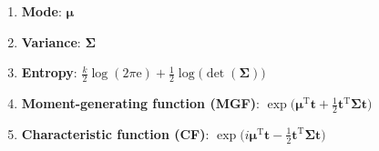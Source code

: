 \begin{enumerate}
    \item
    \textbf{Mode}:
    $ \bm{\mu} $
    \hfill\cite{wiki/Multivariate_normal_distribution}

    \item
    \textbf{Variance}:
    $ \bm{\Sigma} $
    \hfill\cite{wiki/Multivariate_normal_distribution}






    \item
    \textbf{Entropy}: $  {\displaystyle {\frac {k}{2}}\log {\mathord {\left(2\pi \mathrm {e} \right)}}+{\frac {1}{2}}\log (\det {\mathord {\left({\boldsymbol {\Sigma }}\right)}}}) $
    \hfill\cite{wiki/Multivariate_normal_distribution}

    \item
    \textbf{Moment-generating function (MGF)}: $  {\displaystyle \exp \!{\Big (}{\boldsymbol {\mu }}^{\mathrm {T} }\mathbf {t} +{\tfrac {1}{2}}\mathbf {t} ^{\mathrm {T} }{\boldsymbol {\Sigma }}\mathbf {t} {\Big )}} $
    \hfill\cite{wiki/Multivariate_normal_distribution}

    \item
    \textbf{Characteristic function (CF)}: $  {\displaystyle \exp \!{\Big (}i{\boldsymbol {\mu }}^{\mathrm {T} }\mathbf {t} -{\tfrac {1}{2}}\mathbf {t} ^{\mathrm {T} }{\boldsymbol {\Sigma }}\mathbf {t} {\Big )}} $
    \hfill\cite{wiki/Multivariate_normal_distribution}



\end{enumerate}
